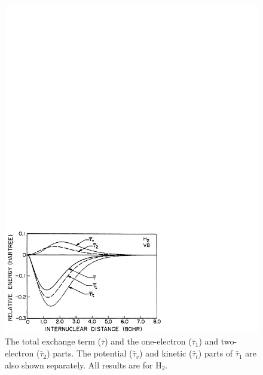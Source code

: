 \begin{figure}
\includegraphics[scale=0.75]{fig2-31}
\caption{The total exchange term ($\bar{\tau}$) and the one-electron
  ($\bar{\tau}_1$) and two-electron ($\bar{\tau}_2$)
  parts. The potential ($\bar{\tau}_v$) and kinetic ($\bar{\tau}_t$)
  parts of $\bar{\tau}_1$ are also shown separately. All results are
  for H$_2$.}
\label{fig2-31}
\end{figure}

